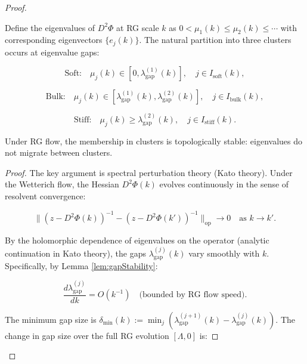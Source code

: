 \begin{proof}
\begin{lemma}
\label{lem:clusterSeparationPersistence}

Define the eigenvalues of $D^2\Phi$ at RG scale $k$ as $0 < \mu_1(k) \leq \mu_2(k) \leq \cdots$ with corresponding eigenvectors $\{e_j(k)\}$. The natural partition into three clusters occurs at eigenvalue gaps:

\begin{equation}
\text{Soft:} \quad \mu_j(k) \in [0, \lambda_{\mathrm{gap}}^{(1)}(k)], \quad j \in I_{\mathrm{soft}}(k),
\end{equation}

\begin{equation}
\text{Bulk:} \quad \mu_j(k) \in [\lambda_{\mathrm{gap}}^{(1)}(k), \lambda_{\mathrm{gap}}^{(2)}(k)], \quad j \in I_{\mathrm{bulk}}(k),
\end{equation}

\begin{equation}
\text{Stiff:} \quad \mu_j(k) \geq \lambda_{\mathrm{gap}}^{(2)}(k), \quad j \in I_{\mathrm{stiff}}(k).
\end{equation}

Under RG flow, the membership in clusters is topologically stable: eigenvalues do not migrate between clusters.

\begin{proof}

The key argument is spectral perturbation theory (Kato theory). Under the Wetterich flow, the Hessian $D^2\Phi(k)$ evolves continuously in the sense of resolvent convergence:

\begin{equation}
\|(z - D^2\Phi(k))^{-1} - (z - D^2\Phi(k'))^{-1}\|_{\mathrm{op}} \to 0 \quad \text{as } k \to k'.
\end{equation}

By the holomorphic dependence of eigenvalues on the operator (analytic continuation in Kato theory), the gaps $\lambda_{\mathrm{gap}}^{(j)}(k)$ vary smoothly with $k$. Specifically, by Lemma \ref{lem:gapStability}:

\begin{equation}
\frac{d\lambda_{\mathrm{gap}}^{(j)}}{dk} = O(k^{-1}) \quad \text{(bounded by RG flow speed)}.
\end{equation}

The minimum gap size is $\delta_{\min}(k) := \min_j (\lambda_{\mathrm{gap}}^{(j+1)}(k) - \lambda_{\mathrm{gap}}^{(j)}(k))$. The change in gap size over the full RG evolution $[\Lambda, 0]$ is:


\end{proof}
\end{lemma}
\end{proof}
